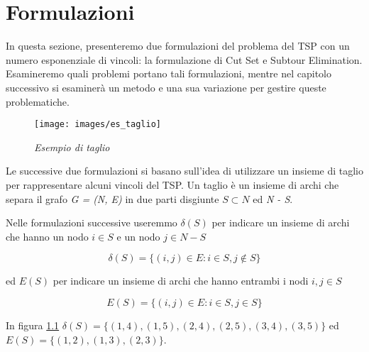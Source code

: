\chapter{Formulazioni}\label{formulazioni}

In questa sezione, presenteremo due formulazioni del problema del TSP con un numero esponenziale di vincoli: la formulazione di Cut Set e Subtour Elimination. Esamineremo quali problemi portano tali formulazioni, mentre nel capitolo successivo si esaminerà un metodo e una sua variazione per gestire queste problematiche. 

\begin{figure}[ht]
	\centering
	\texttt{[image: images/es\_taglio]}
	\caption{\textit{Esempio di taglio}}
	\label{img:es_taglio}
\end{figure}

Le successive due formulazioni si basano sull'idea di utilizzare un insieme di taglio per rappresentare alcuni vincoli del TSP. Un taglio è un insieme di archi che separa il grafo \textit{G = (N, E)} in due parti disgiunte \begin{math}S \subset N\end{math} ed \textit{N - S}. 

Nelle formulazioni successive useremmo \begin{math}\delta(S)\end{math} per indicare un insieme di archi che hanno un nodo \begin{math}i \in S\end{math} e un nodo \begin{math}j \in N - S\end{math}

\[
\delta(S) = \{ (i,j) \in E: i \in S, j \notin S \}
\]

ed \begin{math}E(S)\end{math} per indicare un insieme di archi che hanno entrambi i nodi \begin{math}i, j \in S\end{math}

\[
E(S) = \{ (i,j) \in E: i \in S, j \in S\}
\]

In figura \ref{img:es_taglio} \begin{math}\delta(S) = \{ (1, 4), (1, 5), (2, 4), (2, 5), (3, 4), (3, 5)\}\end{math} ed \begin{math}E(S) = \{ (1, 2), (1, 3), (2, 3)\}\end{math}.

